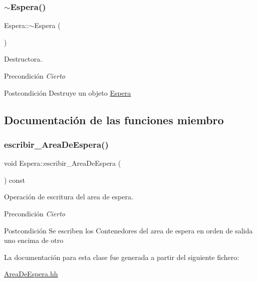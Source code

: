 \subsubsection{\texorpdfstring{$\sim$\+Espera()}{~Espera()}}
{\footnotesize\ttfamily Espera\+::$\sim$\+Espera (\begin{DoxyParamCaption}{ }\end{DoxyParamCaption})}



Destructora. 

\begin{DoxyPrecond}{Precondición}
{\itshape Cierto} 
\end{DoxyPrecond}
\begin{DoxyPostcond}{Postcondición}
Destruye un objeto \hyperlink{class_espera}{Espera} 
\end{DoxyPostcond}


\subsection{Documentación de las funciones miembro}
\mbox{\label{class_espera_aacb008e5be8ecd85fbba9cdef8b8be33}} 
\subsubsection{\texorpdfstring{escribir\+\_\+\+Area\+De\+Espera()}{escribir\_AreaDeEspera()}}
{\footnotesize\ttfamily void Espera\+::escribir\+\_\+\+Area\+De\+Espera (\begin{DoxyParamCaption}{ }\end{DoxyParamCaption}) const}



Operación de escritura del area de espera. 

\begin{DoxyPrecond}{Precondición}
{\itshape Cierto} 
\end{DoxyPrecond}
\begin{DoxyPostcond}{Postcondición}
Se escriben los Contenedores del area de espera en orden de salida uno encima de otro 
\end{DoxyPostcond}


La documentación para esta clase fue generada a partir del siguiente fichero\+:\begin{DoxyCompactItemize}
\item 
\hyperlink{_area_de_espera_8hh}{Area\+De\+Espera.\+hh}\end{DoxyCompactItemize}
